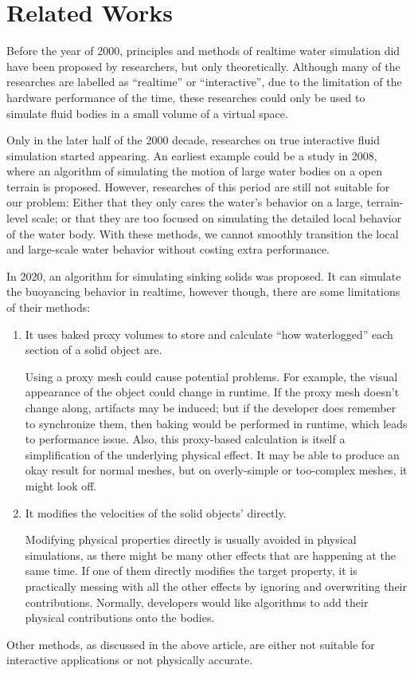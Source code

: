 \section{Related Works}
Before the year of 2000, principles and methods of realtime water simulation did have been proposed by researchers\cite{CHE97}, but only theoretically.
Although many of the researches are labelled as ``realtime'' or ``interactive'', due to the limitation of the hardware performance of the time, these researches could only be used to simulate fluid bodies in a small volume of a virtual space.

Only in the later half of the 2000 decade, researches on true interactive fluid simulation started appearing.
An earliest example could be a study in 2008\cite{JUD08}, where an algorithm of simulating the motion of large water bodies on a open terrain is proposed.
However, researches of this period are still not suitable for our problem:
Either that they only cares the water's behavior on a large, terrain-level scale;
or that they are too focused on simulating the detailed local behavior of the water body.
With these methods, we cannot smoothly transition the local and large-scale water behavior without costing extra performance.

In 2020, an algorithm for simulating sinking solids was proposed\cite{RBM20}.
It can simulate the buoyancing behavior in realtime, however though, there are some limitations of their methods:
\begin{enumerate}
	\item It uses baked proxy volumes to store and calculate ``how waterlogged'' each section of a solid object are.

		Using a proxy mesh could cause potential problems.
		For example, the visual appearance of the object could change in runtime.
		If the proxy mesh doesn't change along, artifacts may be induced;
		but if the developer does remember to synchronize them, then baking would be performed in runtime, which leads to performance issue.
		Also, this proxy-based calculation is itself a simplification of the underlying physical effect.
		It may be able to produce an okay result for normal meshes, but on overly-simple or too-complex meshes, it might look off.

	\item It modifies the velocities of the solid objects' directly.

		Modifying physical properties directly is usually avoided in physical simulations, as there might be many other effects that are happening at the same time.
		If one of them directly modifies the target property, it is practically messing with all the other effects by ignoring and overwriting their contributions.
		Normally, developers would like algorithms to add their physical contributions onto the bodies.

\end{enumerate}
Other methods, as discussed in the above article, are either not suitable for interactive applications or not physically accurate.

